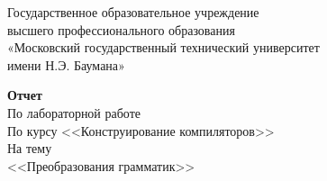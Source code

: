 \begin{titlepage}
	
	
	\thispagestyle{empty}
	
	\begin{figure}[t]
	\end{figure}
	\begin{center}
	Государственное образовательное учреждение\\
	высшего профессионального образования\\
 	«Московский государственный технический университет\\
 	имени Н.Э. Баумана»
	\end{center}
	
	\vspace{5cm}
	
	\begin{center}
		\textbf {Отчет}\\
		По лабораторной работе \\
		По курсу <<Конструирование компиляторов>>\\
		На тему\\
		<<Преобразования грамматик>>\\
	\end{center}

	\vspace{8cm}
	

\end{titlepage}